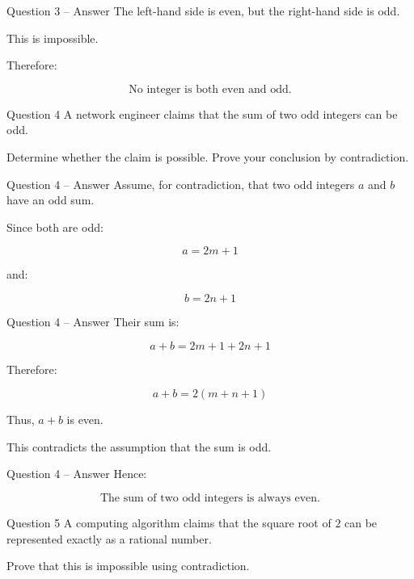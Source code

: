 \begin{frame}{Question 3 -- Answer}
The left-hand side is even, but the right-hand side is odd.

This is impossible.

Therefore:

$$
\boxed{\text{No integer is both even and odd.}}
$$

\end{frame}


\begin{frame}{Question 4}
A network engineer claims that the sum of two odd integers can be odd.

Determine whether the claim is possible. Prove your conclusion by
contradiction.
\end{frame}

\begin{frame}{Question 4 -- Answer}
Assume, for contradiction, that two odd integers $a$ and $b$ have an odd
sum.

Since both are odd:

$$
a=2m+1
$$

and:

$$
b=2n+1
$$

\end{frame}

\begin{frame}{Question 4 -- Answer}
Their sum is:

$$
a+b=2m+1+2n+1
$$

Therefore:

$$
a+b=2(m+n+1)
$$

Thus, $a+b$ is even.

This contradicts the assumption that the sum is odd.
\end{frame}

\begin{frame}{Question 4 -- Answer}
Hence:

$$
\boxed{\text{The sum of two odd integers is always even.}}
$$

\end{frame}


\begin{frame}{Question 5}
A computing algorithm claims that the square root of $2$ can be represented
exactly as a rational number.

Prove that this is impossible using contradiction.
\end{frame}

